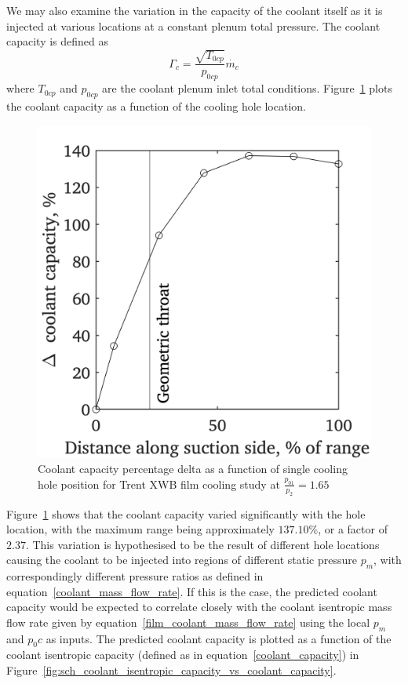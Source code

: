 \documentclass[a4paper, 11pt, oneside]{report}
\begin{document}
We may also examine the variation in the capacity of the coolant itself as it is injected at various locations at a constant plenum total pressure. The coolant capacity is defined as
\begin{equation}\label{coolant_capacity}
\Gamma_c =
\frac{\sqrt{T_{0cp}}}{p_{0cp}}
\dot{m_c}
\end{equation}
where $T_{0cp}$ and $p_{0cp}$ are the coolant plenum inlet total conditions.
Figure~\ref{fig:sch_hole_location_vs_coolant_capacity} plots the coolant capacity as a function of the cooling hole location.

\begin{figure}[H]
      \centering
      \includegraphics[width=.45\textwidth]{figs/sch_hole_location_vs_coolant_capacity.png}
      \caption{Coolant capacity percentage delta as a function of single cooling hole position for Trent XWB film cooling study at $\frac{p_{01}}{p_2}=1.65$}
      \label{fig:sch_hole_location_vs_coolant_capacity}
\end{figure}

Figure~\ref{fig:sch_hole_location_vs_coolant_capacity} shows that the coolant capacity varied significantly with the hole location, with the maximum range being approximately $137.10\%$, or a factor of $2.37$. This variation is hypothesised to be the result of different hole locations causing the coolant to be injected into regions of different static pressure $p_m$, with correspondingly different pressure ratios as defined in equation~\ref{coolant_mass_flow_rate}. If this is the case, the predicted coolant capacity would be expected to correlate closely with the coolant isentropic mass flow rate given by equation~\ref{film_coolant_mass_flow_rate} using the local $p_m$ and $p_0c$ as inputs. The predicted coolant capacity is plotted as a function of the coolant isentropic capacity (defined as in equation~\ref{coolant_capacity}) in Figure~\ref{fig:sch_coolant_isentropic_capacity_vs_coolant_capacity}.
\end{document}
